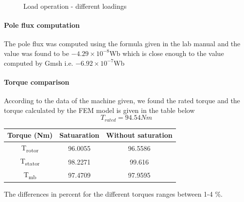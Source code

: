 \documentclass[a4paper,11pt]{article}
\begin{document}
\begin{figure}[h!]
  \quad
  \caption{Load operation - different loadings}
\end{figure}


\paragraph*{Pole flux computation}
The pole flux was computed using the formula given in the lab manual and the value was found to be $-4.29\times10^{-8}$Wb which is close enough to the value computed by Gmsh i.e. $-6.92\times10^{-7}$Wb

\paragraph*{Torque comparison}
According to the data of the machine given, we found the rated torque and the torque calculated by the FEM model is given in the table below
\begin{equation}
  T_{rated}=94.54 Nm
\end{equation}
\begin{center}
\begin{tabular}{|c|c|c|}
  \hline
Torque (Nm)  &  Satuaration & Without saturation \\ \hline
  T\textsubscript{rotor} & 96.0055 & 96.5586 \\ \hline
  T\textsubscript{stator} & 98.2271 & 99.616 \\ \hline
  T\textsubscript{mb} & 97.4709 & 97.9595\\ \hline
\end{tabular}
\end{center}
The differences in percent for the different torques ranges between 1-4 \%.
\end{document}
